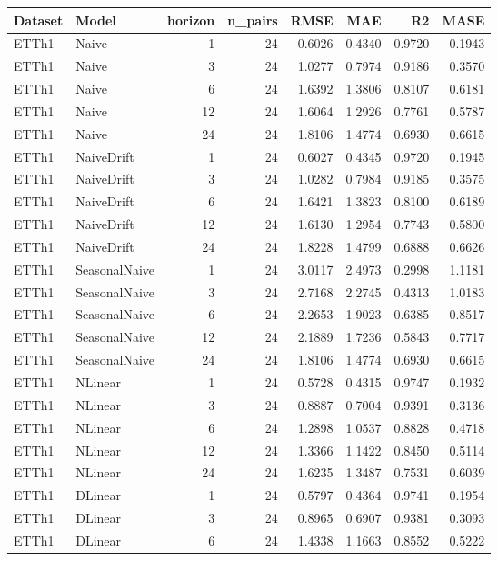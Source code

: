 \begin{tabular}{llrrrrrr}
\toprule
Dataset & Model & horizon & n_pairs & RMSE & MAE & R2 & MASE \\
\midrule
ETTh1 & Naive & 1 & 24 & 0.6026 & 0.4340 & 0.9720 & 0.1943 \\
ETTh1 & Naive & 3 & 24 & 1.0277 & 0.7974 & 0.9186 & 0.3570 \\
ETTh1 & Naive & 6 & 24 & 1.6392 & 1.3806 & 0.8107 & 0.6181 \\
ETTh1 & Naive & 12 & 24 & 1.6064 & 1.2926 & 0.7761 & 0.5787 \\
ETTh1 & Naive & 24 & 24 & 1.8106 & 1.4774 & 0.6930 & 0.6615 \\
ETTh1 & NaiveDrift & 1 & 24 & 0.6027 & 0.4345 & 0.9720 & 0.1945 \\
ETTh1 & NaiveDrift & 3 & 24 & 1.0282 & 0.7984 & 0.9185 & 0.3575 \\
ETTh1 & NaiveDrift & 6 & 24 & 1.6421 & 1.3823 & 0.8100 & 0.6189 \\
ETTh1 & NaiveDrift & 12 & 24 & 1.6130 & 1.2954 & 0.7743 & 0.5800 \\
ETTh1 & NaiveDrift & 24 & 24 & 1.8228 & 1.4799 & 0.6888 & 0.6626 \\
ETTh1 & SeasonalNaive & 1 & 24 & 3.0117 & 2.4973 & 0.2998 & 1.1181 \\
ETTh1 & SeasonalNaive & 3 & 24 & 2.7168 & 2.2745 & 0.4313 & 1.0183 \\
ETTh1 & SeasonalNaive & 6 & 24 & 2.2653 & 1.9023 & 0.6385 & 0.8517 \\
ETTh1 & SeasonalNaive & 12 & 24 & 2.1889 & 1.7236 & 0.5843 & 0.7717 \\
ETTh1 & SeasonalNaive & 24 & 24 & 1.8106 & 1.4774 & 0.6930 & 0.6615 \\
ETTh1 & NLinear & 1 & 24 & 0.5728 & 0.4315 & 0.9747 & 0.1932 \\
ETTh1 & NLinear & 3 & 24 & 0.8887 & 0.7004 & 0.9391 & 0.3136 \\
ETTh1 & NLinear & 6 & 24 & 1.2898 & 1.0537 & 0.8828 & 0.4718 \\
ETTh1 & NLinear & 12 & 24 & 1.3366 & 1.1422 & 0.8450 & 0.5114 \\
ETTh1 & NLinear & 24 & 24 & 1.6235 & 1.3487 & 0.7531 & 0.6039 \\
ETTh1 & DLinear & 1 & 24 & 0.5797 & 0.4364 & 0.9741 & 0.1954 \\
ETTh1 & DLinear & 3 & 24 & 0.8965 & 0.6907 & 0.9381 & 0.3093 \\
ETTh1 & DLinear & 6 & 24 & 1.4338 & 1.1663 & 0.8552 & 0.5222 \\

\end{tabular}
